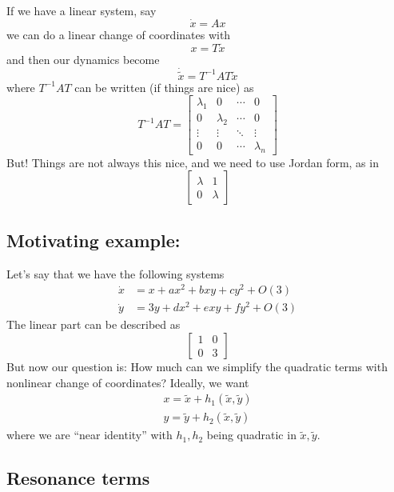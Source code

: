 \documentclass{article}
\begin{document}
If we have a linear system, say 
\[
\dot{x}=Ax
\]
we can do a linear change of coordinates with 
\[
x=T\tilde{x}
\]
and then our dynamics become 
\[
\dot{\tilde{x}}=T^{-1}AT\tilde{x}
\]
where $T^{-1}AT$ can be written (if things are nice) as 
\[
T^{-1}AT=\begin{bmatrix}
    \lambda_1 & 0 & \cdots & 0 \\
    0 & \lambda_2 & \cdots & 0 \\
    \vdots & \vdots & \ddots & \vdots \\
    0 & 0 & \cdots & \lambda_n
\end{bmatrix}
\]
But! Things are not always this nice, and we need to use Jordan form, as in
\[
\begin{bmatrix}
    \lambda & 1\\ 0 & \lambda
\end{bmatrix}
\]

\subsection{Motivating example:}
Let's say that we have the following systems
\begin{align*}
    \dot{x}&=x + ax^2 +bxy + cy^2 + O(3)\\
    \dot{y}&=3y + dx^2 + exy+fy^2 + O(3)
\end{align*}
The linear part can be described as 
\[
\begin{bmatrix}
    1 & 0 \\ 0 & 3
\end{bmatrix}
\]
But now our question is: How much can we simplify the quadratic terms with nonlinear change of coordinates? Ideally, we want
\begin{align*}
    x= \tilde{x} + h_1\left(\tilde{x},\tilde{y}\right)\\
    y = \tilde{y} + h_2\left(\tilde{x},\tilde{y}\right)
\end{align*}
where we are ``near identity'' with $h_1,h_2$ being quadratic in $\tilde{x},\tilde{y}$.

\subsection{Resonance terms}
\end{document}
